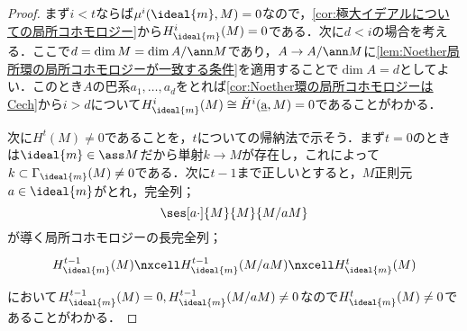 \begin{proof}
	まず$i<t$ならば$\mu^i(\ideal{m},M)=0$なので，\ref{cor:極大イデアルについての局所コホモロジー}から$H^i_{\ideal{m}}(M)=0$である．次に$d<i$の場合を考える．ここで$d=\dim M=\dim A/\ann M$であり，$A\to A/\ann M$に\ref{lem:Noether局所環の局所コホモロジーが一致する条件}を適用することで$\dim A=d$としてよい．このとき$A$の巴系$a_1,\dots,a_d$をとれば\ref{cor:Noether環の局所コホモロジーはCech}から$i>d$について$H^i_{\ideal{m}}(M)\cong\check{H}^i(\underbar{a},M)=0$であることがわかる．
	
	次に$H^t(M)\neq 0$であることを，$t$についての帰納法で示そう．まず$t=0$のときは$\ideal{m}\in\ass M$だから単射$k\to M$が存在し，これによって$k\subset\Gamma_{\ideal{m}}(M)\neq 0$である．次に$t-1$まで正しいとすると，$M$正則元$a\in\ideal{m}$がとれ，完全列；
	\[\ses[a\cdot]{M}{M}{M/aM}\]
	が導く局所コホモロジーの長完全列；
	\[\begin{tikzcd}
		H^{t-1}_{\ideal{m}}(M)\nxcell H^{t-1}_{\ideal{m}}(M/aM)\nxcell H^t_{\ideal{m}}(M)
	\end{tikzcd}\]
	において$H^{t-1}_{\ideal{m}}(M)=0, H^{t-1}_{\ideal{m}}(M/aM)\neq 0$なので$H^{t}_{\ideal{m}}(M)\neq 0$であることがわかる．
	

\end{proof}
